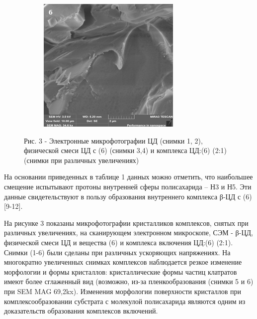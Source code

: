 \begin{figure}[H]
\begin{subfigure}[b]{0.32\textwidth}
    \end{subfigure}
    \begin{subfigure}[b]{0.32\textwidth}
        \centering
        \includegraphics[height=0.9\textwidth]{assets/50}
    \end{subfigure}
    \caption*{Рис. 3 - Электронные микрофотографии ЦД (снимки 1, 2),
    физической смеси ЦД с (6) (снимки 3,4) и комплекса ЦД:(6) (2:1) (снимки
    при различных увеличениях)}
\end{figure}

\begin{multicols}{2}
На основании приведенных в таблице 1 данных можно отметить, что
наибольшее смещение испытывают протоны внутренней сферы полисахарида --
Н3 и Н5. Эти данные свидетельствуют в пользу образования внутреннего
комплекса β-ЦД с (6) {[}9-12{]}.

На рисунке 3 показаны микрофотографии кристалликов комплексов, снятых
при различных увеличениях, на сканирующем электронном микроскопе, СЭМ -
β-ЦД, физической смеси ЦД и вещества (6) и комплекса включения ЦД:(6)
(2:1). Снимки (1-6) были сделаны при различных ускоряющих напряжениях.
На многократно увеличенных снимках комплексов наблюдается резкое
изменение морфологии и формы кристаллов: кристаллические формы частиц
клатратов имеют более сглаженный вид (возможно, из-за пленкообразования
(снимки 5 и 6) при SEM MAG 69,2kx). Изменения морфологии поверхности
кристаллов при комплексообразовании субстрата с молекулой полисахарида
являются одним из доказательств образования комплексов включений.
\end{multicols}

